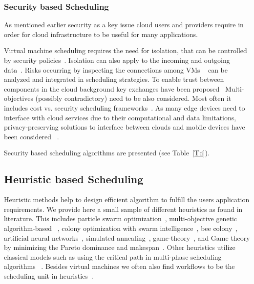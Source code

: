 \documentclass[final,5p,times,twocolumn]{elsarticle}
\begin{document}
\subsubsection{Security based Scheduling}\label{sec:security}



As mentioned earlier security as a key issue cloud users and
providers require in order for cloud infrastructure to be useful for
many applications.

Virtual machine scheduling requires the need for isolation, that can
be controlled by security
policies~\cite{afoulki2011security}. Isolation can also apply to the
incoming and outgoing data~\cite{chejerla2017qos,kashyap2014security}.
Risks occurring by inspecting the connections among VMs
~\cite{shetty2016security} can be analyzed and integrated in
scheduling strategies.  To enable trust between components in the
cloud background key exchanges have been proposed~\cite{liu2013ccbke}
Multi-objectives (possibly contradictory) need to be also
considered. Most often it includes cost vs. security scheduling
frameworks~\cite{kashyap2014security,zeng2015saba,wang2012cloud}.  As
many edge devices need to interface with cloud services due to their
computational and data limitations, privacy-preserving solutions to
interface between clouds and mobile devices have been considered
~\cite{bilogrevic2011meetings}.

Security based scheduling algorithms are presented (see
Table~\ref{T:i}). 





\subsection{Heuristic based Scheduling}\label{sec:heuristic}



Heuristic methods help to design efficient algorithm to fulfill the
users application requirements. We provide here a small sample of
different heuristics as found in literature. This includes particle
swarm optimization~\cite{pandey2010particle}, multi-objective genetic
algorithm-based ~\cite{mezmaz2011parallel,gkasior2016metaheuristic},
colony optimization with swarm intelligence~\cite{mateos2013aco}, bee
colony~\cite{ld2013honey}, artificial neural
networks~\cite{kousiouris2011effects}, simulated
annealing~\cite{torabzadeh2010cloud},
game-theory~\cite{gkasior2016metaheuristic}, and Game theory by
minimizing the Pareto dominance and makespan~\cite{su2013cost}.  Other
heuristics utilize classical models such as using the critical path in
multi-phase scheduling algorithms ~\cite
{abrishami2013deadline}. Besides virtual machines we often also find
workflows to be the scheduling unit in
heuristics~\cite{bousselmi2016qos}.
\end{document}
